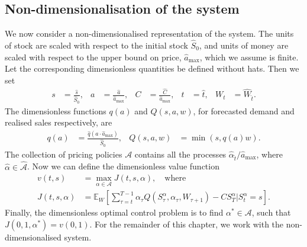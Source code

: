 \documentclass[main.tex]{subfiles}
\begin{document}
\subsection{Non-dimensionalisation of the system}
We now consider a non-dimensionalised representation of the system.
The units of stock are scaled with
respect to the initial stock $\hat{S}_0$, and units of money are
scaled with respect to the upper bound on
price, $\hat{a}_{\mathrm{max}}$, which we assume is finite.
Let the corresponding dimensionless quantities be defined without hats.
Then we set
\begin{align}
  s
  &= \frac{\hat{s}}{\hat{S}_0},
  & a
  &=\frac{\hat{a}}{\hat{a}_{\mathrm{max}}},
  &C&=\frac{\hat{C}}{\hat{a}_{\mathrm{max}}},
  & t &= \hat{t},
  &W_{t}&=\hat{W}_{\hat{t}}.
\end{align}
The dimensionless functions $q(a)$ and $Q(s,a,w)$,
for forecasted demand
and realised sales respectively, are
\begin{align}
  q(a)&= \frac{\hat{q}(a\cdot \hat{a}_{\max})}{\hat{S}_0},
  &Q(s,a, w)&= \min(s, q(a) w).
\end{align}
The collection of pricing policies $\mathcal{A}$ contains all
the processes $\hat{\alpha}_{\hat{t}}/\hat{a}_{\mathrm{max}}$, where
$\hat{\alpha}\in \hat{\mathcal{A}}$.
Now we can define the dimensionless value function
\begin{align}\label{eq:value_function_def_nondim}
  v(t,s)&=\max_{\alpha\in\mathcal{A}}
          J(t,s,\alpha),\quad\text{where}\\
  J(t,s,\alpha)&=
                 \mathbb{E}_{W}\left[ \sum_{\tau=t}^{T-1}
                 \alpha_\tau Q(
                 {S}_\tau^\alpha,\alpha_\tau,
                 W_{\tau+1})
                 - C S_{T}^\alpha \big\vert S_{t}^\alpha =
                 s
                 \right].
                 \label{eq:value_function_def_nondim2}
\end{align}
Finally, the dimensionless optimal control problem
is to find $\alpha^*\in{\mathcal{A}}$, such that
$J(0,1,\alpha^*)=v(0,1)$.
For the remainder of this chapter, we work with the
non-dimensionalised system.%
\end{document}
